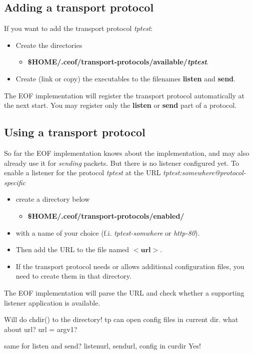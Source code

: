\documentclass[12pt,a4paper]{book}
\begin{document}
\subsection{Adding a transport protocol}
If you want to add the transport protocol \emph{tptest}:
\begin{itemize}
\item Create the directories
\begin{itemize}
\item \textbf{\$HOME/.ceof/transport-protocols/available/\emph{tptest}}.
\end{itemize}
\item Create (link or copy) the executables to the filenames \textbf{listen}
and \textbf{send}.
\end{itemize}
The EOF implementation will register the transport protocol automatically
at the next start. You may register only the \textbf{listen} or
\textbf{send} part of a protocol.
\subsection{Using a transport protocol}
So far the EOF implementation knows about the implementation, and may also
already use it for \emph{sending} packets. But there is no listener configured
yet.
To enable a listener for the protocol \emph{tptest} at the URL
\emph{tptest:somewhere@protocol-specific}
\begin{itemize}
\item create a directory below
\begin{itemize}
\item \textbf{\$HOME/.ceof/transport-protocols/enabled/}
\end{itemize}
\item with a name of your choice (f.i. \emph{tptest-somwhere} or \emph{http-80}).
\item Then add the URL to the file named $<\textbf{url}>$.
\item If the transport protocol needs or allows additional configuration files,
you need to create them in that directory.
\end{itemize}
The EOF implementation will parse the URL and check whether a supporting
listener application is available.

Will do chdir() to the directory! tp can open config files in current dir.
what about url?
   url = argv1?

same for listen and send?
   listenurl, sendurl, config in curdir
Yes!
\end{document}
